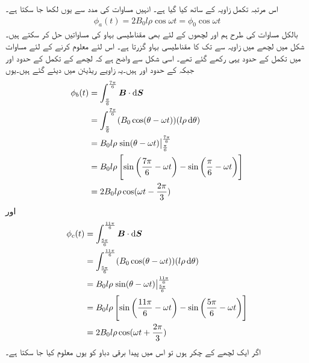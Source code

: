 اس مرتبہ تکمل زاویہ  کے ساتھ کیا گیا ہے۔ انہیں مساوات   کی مدد سے یوں لکھا جا سکتا ہے۔
\begin{align}
\phi_a(t)=2 B_0 l \rho \cos \omega t=\phi_0 \cos \omega t
\end{align}
بالکل مساوات   کی طرح ہم   اور  لچھوں کے لئے  بھی مقناطیسی بہاو کی مساواتیں حل کر سکتے ہیں۔شکل   میں  لچھے میں زاویہ  سے   تک کا مقناطیسی بہاو گزرتا ہے۔ اس لئے   معلوم کرنے کے لئے مساوات   میں تکمل کے حدود یہی رکھے گئے تھے۔ اسی شکل سے واضح ہے کہ  لچھے کے تکمل کے حدود 
  اور  جبکہ  کے حدود  اور  ہیں۔یہ زاویے ریڈیئن میں دیئے گئے ہیں۔یوں
\begin{gather}
\begin{aligned}
\phi_b(t)&=\int_{\frac{\pi}{6}}^{\frac{7\pi}{6}} \kvec{B} \cdot \dif \kvec{S}\\
&=\int_{\frac{\pi}{6}}^{\frac{7\pi}{6}} (B_0 \cos (\theta-\omega t))(l \rho \dif \theta)\\
&=B_0 l \rho \left. \sin (\theta-\omega t) \right|_{\frac{\pi}{6}}^{\frac{7\pi}{6}}\\
&=B_0 l \rho \left[\sin \left(\frac{7\pi}{6}-\omega t \right )-\sin \left (\frac{\pi}{6}-\omega t \right) \right]\\
&=2 B_0 l \rho \cos (\omega t-\frac{2\pi}{3})
\end{aligned}
\end{gather}
اور
\begin{gather}
\begin{aligned}
\phi_c(t)&=\int_{\frac{5\pi}{6}}^{\frac{11\pi}{6}} \kvec{B} \cdot \dif \kvec{S}\\
&=\int_{\frac{5\pi}{6}}^{\frac{11\pi}{6}} (B_0 \cos (\theta-\omega t))(l \rho \dif \theta)\\
&=B_0 l \rho \left. \sin (\theta-\omega t) \right|_{\frac{5\pi}{6}}^{\frac{11\pi}{6}}\\
&=B_0 l \rho \left[\sin \left(\frac{11\pi}{6}-\omega t \right )-\sin \left (\frac{5\pi}{6}-\omega t \right) \right]\\
&=2 B_0 l \rho \cos (\omega t+\frac{2\pi}{3})
\end{aligned}
\end{gather}
اگر ایک لچھے کے  چکر ہوں تو اس میں پیدا برقی دباو کو یوں معلوم کیا جا سکتا ہے۔
